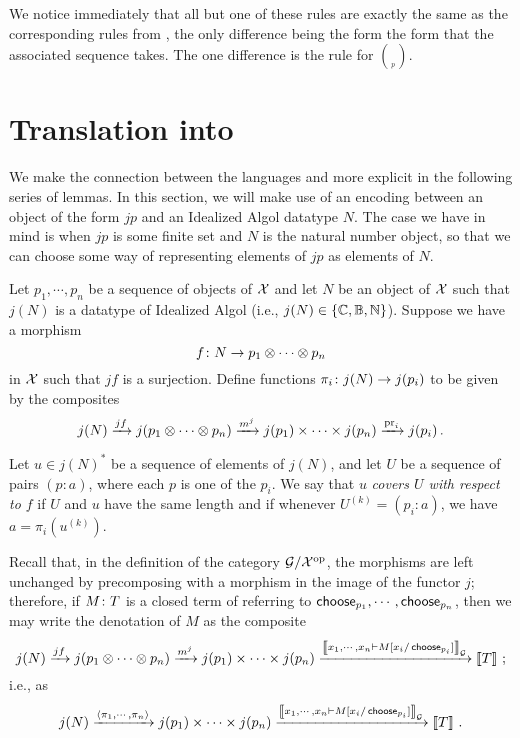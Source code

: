 \documentclass{report}[11pt]
\begin{document}
We notice immediately that all but one of these rules are exactly the same as the corresponding rules from \IAX, the only difference being the form the form that the associated sequence takes.  
The one difference is the rule for $\choose_p$.

\section{Translation into \IAX}

We make the connection between the languages \IAX and \IAXX more explicit in the following series of lemmas.
In this section, we will make use of an encoding between an object of the form $jp$ and an Idealized Algol datatype $N$.  
The case we have in mind is when $jp$ is some finite set and $N$ is the natural number object, so that we can choose some way of representing elements of $jp$ as elements of $N$.

\begin{definition}
  Let $p_1,\cdots,p_n$ be a sequence of objects of $\X$ and let $N$ be an object of $\X$ such that $j(N)$ is a datatype of Idealized Algol (i.e., $j(N)\in\{\bC,\bB,\bN\}$).  
  Suppose we have a morphism
  \[
    f \from N \to p_1 \tensor \cdots \tensor p_n
    \]
  in $\X$ such that $jf$ is a surjection.  
  Define functions $\pi_i\from j(N) \to j(p_i)$ to be given by the composites
  \[
    j(N) \xrightarrow{jf} j(p_1 \tensor \cdots \tensor p_n) \xrightarrow{m^j} j(p_1) \times \cdots \times j(p_n) \xrightarrow{\pr_i} j(p_i)\,.
    \]

  Let $u\in j(N)^*$ be a sequence of elements of $j(N)$, and let $U$ be a sequence of pairs $(p:a)$, where each $p$ is one of the $p_i$.  
  We say that $u$ \emph{covers $U$ with respect to $f$} if $U$ and $u$ have the same length and if whenever $U^{(k)}=(p_i:a)$, we have $a = \pi_i(u^{(k)})$.
  \label{DefCovers}
\end{definition}

Recall that, in the definition of the category $\G/\oppcat\X$, the \Mellies morphisms are left unchanged by precomposing with a morphism in the image of the functor $j$; therefore, if $M\from T$ is a closed term of \IAXX referring to $\choose_{p_1},\cdots,\choose_{p_n}$, then we may write the denotation of $M$ as the composite
\[
  j(N) \xrightarrow{jf} j(p_1 \tensor \cdots \tensor p_n) \xrightarrow{m^j} j(p_1) \times \cdots \times j(p_n) \xrightarrow{\deno{x_1,\cdots,x_n\ts M[x_i/\choose_{p_i}]}_\G} \deno T\,;
  \]
i.e., as
\[
  j(N) \xrightarrow{\langle \pi_1,\cdots,\pi_n\rangle} j(p_1) \times \cdots \times j(p_n) \xrightarrow{\deno{x_1,\cdots,x_n\ts M[x_i/\choose_{p_i}]}_\G} \deno T\,.
  \]
\end{document}
